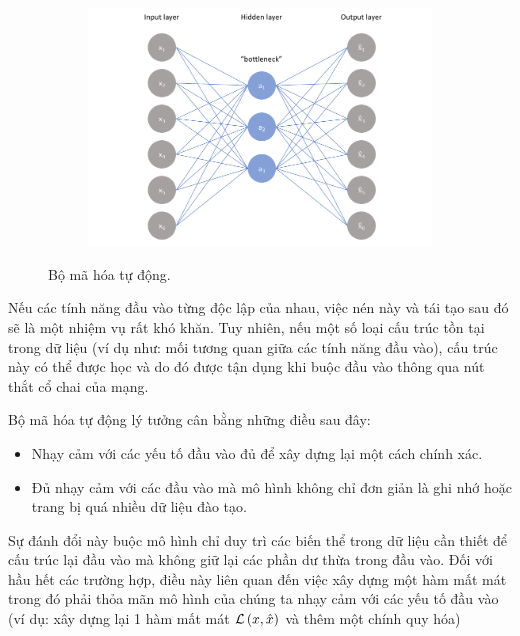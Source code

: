 \begin{figure}
    \begin{subfigure}{0.8\textwidth}
        \includegraphics[width=1.0\linewidth]{Chapters/items/autoencoder1.png}
         
        \label{fig: auto1}
    \end{subfigure}
    \caption{Bộ mã hóa tự động.}
\end{figure}

Nếu các tính năng đầu vào từng độc lập của nhau, việc nén này và tái tạo sau đó sẽ là
một nhiệm vụ rất khó khăn. Tuy nhiên, nếu một số loại cấu trúc tồn tại trong dữ liệu
(ví dụ như: mối tương quan giữa các tính năng đầu vào), cấu trúc này có thể được
học và do đó được tận dụng khi buộc đầu vào thông qua nút thắt cổ chai của mạng.

Bộ mã hóa tự động lý tưởng cân bằng những điều sau đây:
\begin{itemize}[leftmargin=1.5cm]
    \item Nhạy cảm với các yếu tố đầu vào đủ để xây dựng lại một cách chính xác.
    \item Đủ nhạy cảm với các đầu vào mà mô hình không chỉ đơn giản là ghi
          nhớ hoặc trang bị quá nhiều dữ liệu đào tạo.
\end{itemize}

Sự đánh đổi này buộc mô hình chỉ duy trì các biến thể trong dữ liệu cần
thiết để cấu trúc lại đầu vào mà không giữ lại các phần dư thừa trong đầu vào.
Đối với hầu hết các trường hợp, điều này liên quan đến việc xây dựng một hàm mất mát
trong đó phải thỏa mãn mô hình của chúng ta nhạy cảm với các yếu tố đầu vào
(ví dụ: xây dựng lại 1 hàm mất mát ${\cal L}\left( {x,\hat x} \right)$ và
thêm một chính quy hóa)


